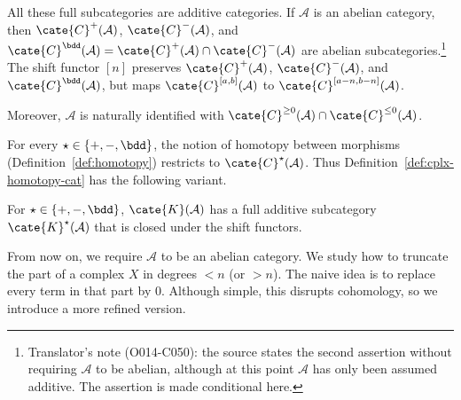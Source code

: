 All these full subcategories are additive categories. If $\mathcal{A}$ is an
abelian category, then $\cate{C}^+(\mathcal{A})$,
$\cate{C}^-(\mathcal{A})$, and
$\cate{C}^{\bdd}(\mathcal{A}) = \cate{C}^+(\mathcal{A}) \cap
\cate{C}^-(\mathcal{A})$ are abelian subcategories.\footnote{Translator's
note (O014-C050): the source states the second assertion without requiring
$\mathcal{A}$ to be abelian, although at this point $\mathcal{A}$ has only
been assumed additive. The assertion is made conditional here.} The shift
functor $[n]$ preserves $\cate{C}^+(\mathcal{A})$,
$\cate{C}^-(\mathcal{A})$, and $\cate{C}^{\bdd}(\mathcal{A})$, but maps
$\cate{C}^{[a,b]}(\mathcal{A})$ to
$\cate{C}^{[a-n, b-n]}(\mathcal{A})$.

Moreover, $\mathcal{A}$ is naturally identified with
$\cate{C}^{\geq 0}(\mathcal{A}) \cap \cate{C}^{\leq 0}(\mathcal{A})$.

For every $\star \in \{+, -, \bdd\}$, the notion of homotopy between
morphisms (Definition~\ref{def:homotopy}) restricts to
$\cate{C}^{\star}(\mathcal{A})$. Thus
Definition~\ref{def:cplx-homotopy-cat} has the following variant.

\begin{definition}\label{def:cplx-homotopy-cat-variant}
	For $\star \in \{+, -, \bdd\}$, $\cate{K}(\mathcal{A})$ has a full
	additive subcategory $\cate{K}^\star(\mathcal{A})$ that is closed under
	the shift functors.
\end{definition}

From now on, we require $\mathcal{A}$ to be an abelian category. We study how
to truncate the part of a complex $X$ in degrees $<n$ (or $>n$). The naive
idea is to replace every term in that part by $0$. Although simple, this
disrupts cohomology, so we introduce a more refined version.

